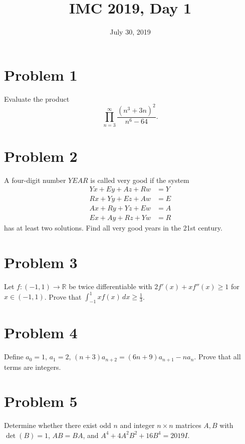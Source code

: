 \documentclass{article}
\title{IMC 2019, Day 1}
\date{July 30, 2019}
\begin{document}
\maketitle

\section*{Problem 1}
Evaluate the product
\[ \prod_{n=3}^\infty \frac{(n^3 + 3n)^2}{n^6 - 64}. \]

\section*{Problem 2}
A four-digit number $YEAR$ is called very good if the system
\begin{align*}
Yx + Ey + Az + Rw &= Y \\
Rx + Yy + Ez + Aw &= E \\
Ax + Ry + Yz + Ew &= A \\
Ex + Ay + Rz + Yw &= R
\end{align*}
has at least two solutions. Find all very good years in the 21st century.

\section*{Problem 3}
Let $f : (-1, 1) \to \mathbb{R}$ be twice differentiable with $2f'(x) + x f''(x) \geq 1$ for $x \in (-1, 1)$. Prove that $\int_{-1}^1 x f(x)\, dx \geq \tfrac{1}{3}$.

\section*{Problem 4}
Define $a_0 = 1$, $a_1 = 2$, $(n+3) a_{n+2} = (6n+9) a_{n+1} - n a_n$. Prove that all terms are integers.

\section*{Problem 5}
Determine whether there exist odd $n$ and integer $n \times n$ matrices $A, B$ with $\det(B) = 1$, $AB = BA$, and $A^4 + 4A^2 B^2 + 16 B^4 = 2019 I$.
\end{document}
